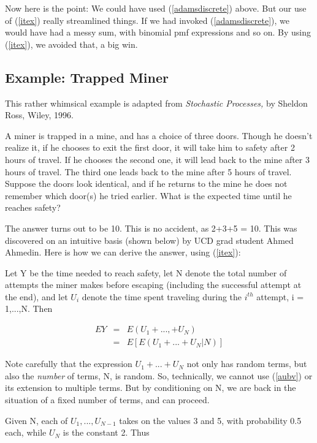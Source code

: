 Now here is the point:  We could have used (\ref{adamsdiscrete}) above.
But our use of (\ref{itex}) really streamlined things.  If we had
invoked (\ref{adamsdiscrete}), we would have had a messy sum, with
binomial pmf expressions and so on.  By using (\ref{itex}), we avoided
that, a big win.

\subsection{Example:  Trapped Miner}
\label{trappedminer}

This rather whimsical example is adapted from \textit{Stochastic
Processes,} by Sheldon Ross, Wiley, 1996.

A miner is trapped in a mine, and has a choice of three doors.  Though
he doesn't realize it, if he chooses to exit the first door, it will
take him to safety after 2 hours of travel.  If he chooses the second
one, it will lead back to the mine after 3 hours of travel. The third
one leads back to the mine after 5 hours of travel. Suppose the doors
look identical, and if he returns to the mine he does not remember which
door(s) he tried earlier. What is the expected time until he reaches
safety?

The answer turns out to be 10.  This is no accident, as 2+3+5 = 10.
This was discovered on an intuitive basis (shown below) by UCD grad
student Ahmed Ahmedin.  Here is how we can derive the answer, using
(\ref{itex}):

Let Y be the time needed to reach safety, let N denote the total
number of attempts the miner makes before escaping (including the
successful attempt at the end), and let $U_i$ denote the time spent
traveling during the $i^{th}$ attempt, i = 1,...,N.  Then

\begin{eqnarray}
EY &=& E(U_1+...,+U_N) \\ 
&=& E \left [ E(U_1+...+U_N | N) \right ] 
\end{eqnarray}

Note carefully that the expression $U_1+...+U_N$ not only has random
terms, but also the {\it number} of terms, N, is random.  So,
technically, we cannot use (\ref{aubv}) or its extension to multiple
terms.  But by conditioning on N, we are back in the situation of a
fixed number of terms, and can proceed.

Given N, each of $U_1,...,U_{N-1}$ takes on the values 3 and 5, with
probability 0.5 each, while $U_N$ is the constant 2.  Thus

